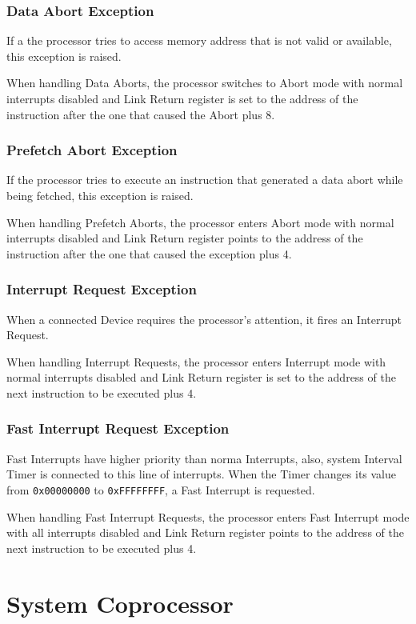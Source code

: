 \subsubsection{Data Abort Exception}
If a the processor tries to access memory address that is not valid or available, this exception is raised.

When handling Data Aborts, the processor switches to Abort mode with normal interrupts disabled and Link Return register is set to the address of the instruction after the one that caused the Abort plus 8.


\subsubsection{Prefetch Abort Exception}
If the processor tries to execute an instruction that generated a data abort while being fetched, this exception is raised.

When handling Prefetch Aborts, the processor enters Abort mode with normal interrupts disabled and Link Return register points to the address of the instruction after the one that caused the exception plus 4.

\subsubsection{Interrupt Request Exception}
When a connected Device requires the processor's attention, it fires an Interrupt Request.

When handling Interrupt Requests, the processor enters Interrupt mode with normal interrupts disabled and Link Return register is set to the address of the next instruction to be executed plus 4.

\subsubsection{Fast Interrupt Request Exception}
Fast Interrupts have higher priority than norma Interrupts, also, system Interval Timer is connected to this line of interrupts. When the Timer changes its value from \texttt{0x00000000} to \texttt{0xFFFFFFFF}, a Fast Interrupt is requested.

When handling Fast Interrupt Requests, the processor enters Fast Interrupt mode with all interrupts disabled and Link Return register points to the address of the next instruction to be executed plus 4.

\section{System Coprocessor}

